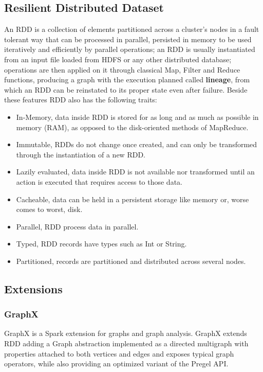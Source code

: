 \subsection{Resilient Distributed Dataset}
An RDD is a collection of elements partitioned across a cluster's nodes in a fault tolerant way that can be processed in parallel, persisted in memory to be used iteratively and efficiently by parallel operations; an RDD is usually instantiated from an input file loaded from HDFS or any other distributed database; operations are then applied on it through classical Map, Filter and Reduce functions, producing a graph with the execution planned called \textbf{lineage}, from which an RDD can be reinstated to its proper state even after failure.
Beside these features RDD also has the following traits:
\begin{itemize}
	\item In-Memory, data inside RDD is stored for as long and as much as possible in memory (RAM), as opposed to the disk-oriented methods of MapReduce.
	\item Immutable, RDDs do not change once created, and can only be transformed through the instantiation of a new RDD.
	\item Lazily evaluated, data inside RDD is not available nor transformed until an action is executed that requires access to those data.
	\item Cacheable, data can be held in a persistent storage like memory or, worse comes to worst, disk.
	\item Parallel, RDD process data in parallel.
	\item Typed, RDD records have types such as Int or String.
	\item Partitioned, records are partitioned and distributed across several nodes.
\end{itemize}

\subsection{Extensions}
\subsubsection{GraphX}

GraphX is a Spark extension for graphs and graph analysis. GraphX extends RDD adding a Graph abstraction implemented as a directed multigraph with properties attached to both vertices and edges and exposes typical graph operators, while also providing an optimized variant of the Pregel API.

